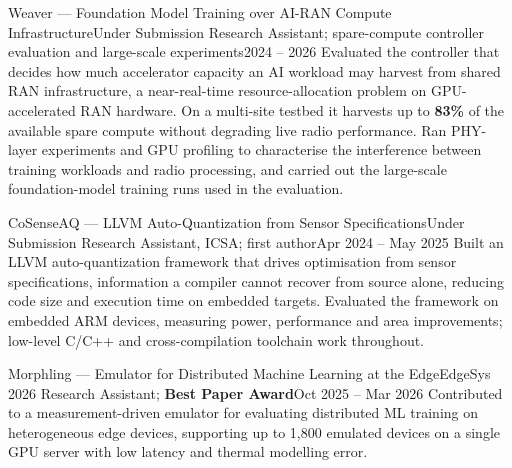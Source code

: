     \resumeSubheading
      {Weaver --- Foundation Model Training over AI-RAN Compute Infrastructure}{Under Submission}
      {Research Assistant; spare-compute controller evaluation and large-scale experiments}{2024 -- 2026}
      \resumeItemListStart
          {Evaluated the controller that decides how much accelerator capacity an AI workload may harvest from shared RAN infrastructure, a near-real-time resource-allocation problem on GPU-accelerated RAN hardware. On a multi-site testbed it harvests up to \textbf{83\%} of the available spare compute without degrading live radio performance.}
          {Ran PHY-layer experiments and GPU profiling to characterise the interference between training workloads and radio processing, and carried out the large-scale foundation-model training runs used in the evaluation.}
      \resumeItemListEnd

    \resumeSubheading
      {CoSenseAQ --- LLVM Auto-Quantization from Sensor Specifications}{Under Submission}
      {Research Assistant, ICSA; first author}{Apr 2024 -- May 2025}
      \resumeItemListStart
          {Built an LLVM auto-quantization framework that drives optimisation from sensor specifications, information a compiler cannot recover from source alone, reducing code size and execution time on embedded targets.}
          {Evaluated the framework on embedded ARM devices, measuring power, performance and area improvements; low-level C/C++ and cross-compilation toolchain work throughout.}
      \resumeItemListEnd

    \resumeSubheading
      {Morphling --- Emulator for Distributed Machine Learning at the Edge}{EdgeSys 2026}
      {Research Assistant; \textbf{Best Paper Award}}{Oct 2025 -- Mar 2026}
      \resumeItemListStart
          {Contributed to a measurement-driven emulator for evaluating distributed ML training on heterogeneous edge devices, supporting up to 1,800 emulated devices on a single GPU server with low latency and thermal modelling error.}
      \resumeItemListEnd

  \resumeSubHeadingListEnd

